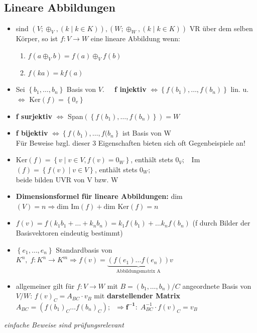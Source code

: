 \documentclass[10pt,a4paper]{article}
\begin{document}
\subsection{Lineare Abbildungen}
\begin{itemize}
\item sind $(V; \oplus_{V}, (k\mid k\in K)),(W; \oplus_{W}, (k\mid k\in K))$ VR über dem selben Körper, so ist $f:V \rightarrow W$ eine lineare Abbildung wenn:
\begin{enumerate}
\item $f(a \oplus_{V} b) =f(a)\oplus_{V} f(b)$
\item $f(ka)=kf(a)$
\end{enumerate}


\item Sei $\left\lbrace b_{1},\dotsc,b_{n}\right\rbrace$ Basis von $V.\;\;\;\;$   \textbf{f injektiv} $\Leftrightarrow \left\lbrace f(b_{1}), \dotsc,f(b_{n}) \right\rbrace $ lin. u. $\Leftrightarrow$ Ker$(f)=\left\lbrace 0_{v} \right\rbrace$
\item \textbf{f surjektiv} $\Leftrightarrow$ Span$(\left\lbrace f(b_{1}), \dotsc,f(b_{n}) \right\rbrace)=W$
\item \textbf{f bijektiv} $\Leftrightarrow \left\lbrace f(b_{1}), \dotsc,f(b_{n}\right\rbrace$ ist Basis von W\\ Für Beweise bzgl. dieser 3 Eigenschaften bieten sich oft Gegenbeispiele an!
\item Ker$(f)=\left\lbrace v \mid v \in V, f(v)=0_{W}\right\rbrace$, enthält stets $0_{V};\;\;$ Im$(f)=\left\lbrace f(v) \mid v\in V\right\rbrace$, enthält stets $0_{W};$\\ beide bilden UVR von V bzw. W 
\item \textbf{Dimensionsformel für lineare Abbildungen:} dim$(V)=n\Rightarrow\text{dim Im}(f)+\text{dim Ker}(f)=n$
\item $f(v)=f(k_{1}b_{1}+\dotsc + k_{n}b_{n})=k_{1}f(b_{1})+\dotsc k_{n}f(b_{n})$ (f durch Bilder der Basisvektoren eindeutig bestimmt)
\item $\left\lbrace e_{1},\dotsc,e_{n}\right\rbrace$ Standardbasis von $K^{n},\;f: K^{n}\rightarrow K^{m}\Rightarrow f(v)=\underbrace{(f(e_{1})\dotsc f(e_{n}))}_{\text{Abbildungsmatrix A}}v$
\item allgemeiner gilt für $f:V\rightarrow W$ mit $B=(b_{1},\dotsc,b_{n})/C$ angeordnete Basis von $V/W$: $f(v)_{C}=A_{BC}\cdot v_{B}$ mit \textbf{darstellender Matrix} $A_{BC}=(f(b_{1})_{C}\dotsc f(b_{n})_{C});\;\;\Rightarrow\boldsymbol{f^{-1}:}\; A_{BC}^{-1}\cdot f(v)_{C}=v_{B} $ 
\end{itemize}
\textit{einfache Beweise sind prüfungsrelevant}
\end{document}
